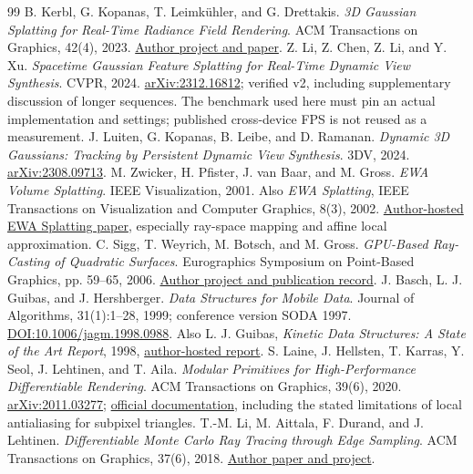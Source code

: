 \documentclass[10pt,letterpaper]{article}
\theoremstyle{remark}\newtheorem{counterexample}[proposition]{Counterexample}
\begin{document}
\begin{thebibliography}{99}
\small
{} B. Kerbl, G. Kopanas, T. Leimk\"uhler, and G. Drettakis. \emph{3D Gaussian Splatting for Real-Time Radiance Field Rendering}. ACM Transactions on Graphics, 42(4), 2023. \href{https://repo-sam.inria.fr/fungraph/3d-gaussian-splatting/}{Author project and paper}.
 Z. Li, Z. Chen, Z. Li, and Y. Xu. \emph{Spacetime Gaussian Feature Splatting for Real-Time Dynamic View Synthesis}. CVPR, 2024. \href{https://arxiv.org/abs/2312.16812}{arXiv:2312.16812}; verified v2, including supplementary discussion of longer sequences. The benchmark used here must pin an actual implementation and settings; published cross-device FPS is not reused as a measurement.
 J. Luiten, G. Kopanas, B. Leibe, and D. Ramanan. \emph{Dynamic 3D Gaussians: Tracking by Persistent Dynamic View Synthesis}. 3DV, 2024. \href{https://arxiv.org/abs/2308.09713}{arXiv:2308.09713}.
 M. Zwicker, H. Pfister, J. van Baar, and M. Gross. \emph{EWA Volume Splatting}. IEEE Visualization, 2001. Also \emph{EWA Splatting}, IEEE Transactions on Visualization and Computer Graphics, 8(3), 2002. \href{https://cgl.ethz.ch/Downloads/Publications/Papers/2002/p_Zwi02b.pdf}{Author-hosted EWA Splatting paper}, especially ray-space mapping and affine local approximation.
 C. Sigg, T. Weyrich, M. Botsch, and M. Gross. \emph{GPU-Based Ray-Casting of Quadratic Surfaces}. Eurographics Symposium on Point-Based Graphics, pp. 59--65, 2006. \href{https://reality.tf.fau.de/projects/quadrics/pbg06.html}{Author project and publication record}.
 J. Basch, L. J. Guibas, and J. Hershberger. \emph{Data Structures for Mobile Data}. Journal of Algorithms, 31(1):1--28, 1999; conference version SODA 1997. \href{https://doi.org/10.1006/jagm.1998.0988}{DOI:10.1006/jagm.1998.0988}. Also L. J. Guibas, \emph{Kinetic Data Structures: A State of the Art Report}, 1998, \href{https://graphics.stanford.edu/courses/cs428-03-spring/Papers/readings/CollaborativeProcessing/g-kds.pdf}{author-hosted report}.
 S. Laine, J. Hellsten, T. Karras, Y. Seol, J. Lehtinen, and T. Aila. \emph{Modular Primitives for High-Performance Differentiable Rendering}. ACM Transactions on Graphics, 39(6), 2020. \href{https://arxiv.org/abs/2011.03277}{arXiv:2011.03277}; \href{https://nvlabs.github.io/nvdiffrast/}{official documentation}, including the stated limitations of local antialiasing for subpixel triangles.
 T.-M. Li, M. Aittala, F. Durand, and J. Lehtinen. \emph{Differentiable Monte Carlo Ray Tracing through Edge Sampling}. ACM Transactions on Graphics, 37(6), 2018. \href{https://people.csail.mit.edu/tzumao/diffrt/}{Author paper and project}.

\end{thebibliography}
\end{document}
